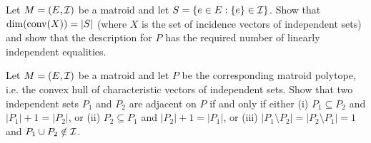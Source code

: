\documentclass[12pt]{article}
\begin{document}
\begin{exercises}
\item \label{ex:fulldim}
Let $M=(E,{\cal I})$ be a matroid and let $S=\{e\in E: \{e\}\in {\cal
  I}\}$. Show that $\dim(\operatorname{conv}(X))=|S|$ (where $X$ is the set of
incidence vectors of independent sets)
and show that the description for $P$ has the required number of
linearly independent equalities. 

\item
Let $M=(E, {\cal I})$ be a matroid and let $P$ be the corresponding
matroid  polytope, i.e. the convex hull of characteristic vectors of
independent sets. Show that two independent sets $P_1$ and $P_2$ are
adjacent on $P$ if and only if either (i) $P_1\subseteq P_2$ and
$|P_1|+1=|P_2|$, or (ii) $P_2\subseteq P_1$ and $|P_2|+1=|P_1|$, or
(iii)   
$|P_1\setminus P_2|=|P_2\setminus P_1|=1$ and $P_1\cup P_2\notin
{\cal I}$. 

\end{exercises}
\end{document}
